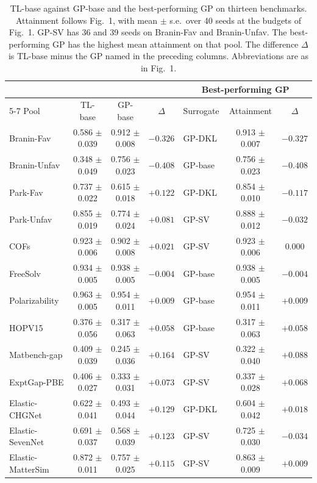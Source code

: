 \begin{table}[p]
\centering
\scriptsize
\caption{TL-base against GP-base and the best-performing GP on thirteen benchmarks. Attainment follows Fig.~1, with mean $\pm$ s.e.\ over 40 seeds at the budgets of Fig.~1. GP-SV has 36 and 39 seeds on Branin-Fav and Branin-Unfav. The best-performing GP has the highest mean attainment on that pool. The difference $\Delta$ is TL-base minus the GP named in the preceding columns. Abbreviations are as in Fig.~1.}
\label{supptab:tlbase_vs_gp}
\setlength{\tabcolsep}{4pt}%
\begin{tabular}{@{}l ccc lcc@{}}
\toprule
& & & & \multicolumn{3}{c}{Best-performing GP} \\
\cmidrule(lr){5-7}
Pool & TL-base & GP-base & $\Delta$ & Surrogate & Attainment & $\Delta$ \\
\midrule
Branin-Fav & 0.586 $\pm$ 0.039 & 0.912 $\pm$ 0.008 & $-0.326$ & GP-DKL & 0.913 $\pm$ 0.007 & $-0.327$ \\
Branin-Unfav & 0.348 $\pm$ 0.049 & 0.756 $\pm$ 0.023 & $-0.408$ & GP-base & 0.756 $\pm$ 0.023 & $-0.408$ \\
Park-Fav & 0.737 $\pm$ 0.022 & 0.615 $\pm$ 0.018 & $+0.122$ & GP-DKL & 0.854 $\pm$ 0.010 & $-0.117$ \\
Park-Unfav & 0.855 $\pm$ 0.019 & 0.774 $\pm$ 0.024 & $+0.081$ & GP-SV & 0.888 $\pm$ 0.012 & $-0.032$ \\
COFs & 0.923 $\pm$ 0.006 & 0.902 $\pm$ 0.008 & $+0.021$ & GP-SV & 0.923 $\pm$ 0.006 & $0.000$ \\
FreeSolv & 0.934 $\pm$ 0.005 & 0.938 $\pm$ 0.005 & $-0.004$ & GP-base & 0.938 $\pm$ 0.005 & $-0.004$ \\
Polarizability & 0.963 $\pm$ 0.005 & 0.954 $\pm$ 0.011 & $+0.009$ & GP-base & 0.954 $\pm$ 0.011 & $+0.009$ \\
HOPV15 & 0.376 $\pm$ 0.056 & 0.317 $\pm$ 0.063 & $+0.058$ & GP-base & 0.317 $\pm$ 0.063 & $+0.058$ \\
Matbench-gap & 0.409 $\pm$ 0.039 & 0.245 $\pm$ 0.036 & $+0.164$ & GP-SV & 0.322 $\pm$ 0.040 & $+0.088$ \\
ExptGap-PBE & 0.406 $\pm$ 0.027 & 0.333 $\pm$ 0.031 & $+0.073$ & GP-SV & 0.337 $\pm$ 0.028 & $+0.068$ \\
Elastic-CHGNet & 0.622 $\pm$ 0.041 & 0.493 $\pm$ 0.044 & $+0.129$ & GP-DKL & 0.604 $\pm$ 0.042 & $+0.018$ \\
Elastic-SevenNet & 0.691 $\pm$ 0.037 & 0.568 $\pm$ 0.039 & $+0.123$ & GP-SV & 0.725 $\pm$ 0.030 & $-0.034$ \\
Elastic-MatterSim & 0.872 $\pm$ 0.011 & 0.757 $\pm$ 0.025 & $+0.115$ & GP-SV & 0.863 $\pm$ 0.009 & $+0.009$ \\
\bottomrule
\end{tabular}
\end{table}

